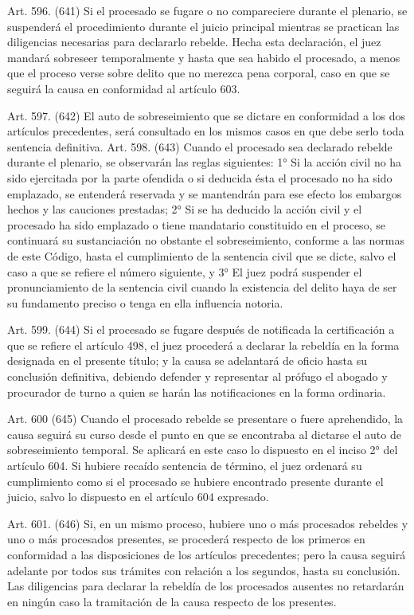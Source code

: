     Art. 596. (641) Si el procesado se fugare o no compareciere durante el plenario, se suspenderá el procedimiento durante el juicio principal mientras se practican las diligencias necesarias para declararlo rebelde.
    Hecha esta declaración, el juez mandará sobreseer temporalmente y hasta que sea habido el procesado, a menos que el proceso verse sobre delito que no merezca pena corporal, caso en que se seguirá la causa en conformidad al artículo 603.

    Art. 597. (642) El auto de sobreseimiento que se dictare en conformidad a los dos artículos precedentes, será consultado en los mismos casos en que debe serlo toda sentencia definitiva.
    Art. 598. (643) Cuando el procesado sea declarado rebelde durante el plenario, se observarán las reglas siguientes:
    1° Si la acción civil no ha sido ejercitada por la parte ofendida o si deducida ésta el procesado no ha sido emplazado, se entenderá reservada y se mantendrán para ese efecto los embargos hechos y las cauciones prestadas;
    2° Si se ha deducido la acción civil y el procesado ha sido emplazado o tiene mandatario constituido en el proceso, se continuará su sustanciación no obstante el sobreseimiento, conforme a las normas de este Código, hasta el cumplimiento de la sentencia civil que se dicte, salvo el caso a que se refiere el número siguiente, y
    3° El juez podrá suspender el pronunciamiento de la sentencia civil cuando la existencia del delito haya de ser su fundamento preciso o tenga en ella influencia notoria.


    Art. 599. (644) Si el procesado se fugare después de notificada la certificación a que se refiere el artículo 498, el juez procederá a declarar la rebeldía en la forma designada en el presente título; y la causa se adelantará de oficio hasta su conclusión definitiva,  debiendo defender y representar al prófugo el abogado y procurador de turno a quien se harán las notificaciones en la forma ordinaria.

   
    Art. 600 (645) Cuando el procesado rebelde se presentare o fuere aprehendido, la causa seguirá su curso desde el punto en que se encontraba al dictarse el auto de sobreseimiento temporal. Se aplicará en este caso lo dispuesto en el inciso 2° del artículo 604.
    Si hubiere recaído sentencia de término, el juez ordenará su cumplimiento como si el procesado se hubiere encontrado presente durante el juicio, salvo lo dispuesto en el artículo 604 expresado.



    Art. 601. (646) Si, en un mismo proceso, hubiere uno o más procesados rebeldes y uno o más procesados presentes, se procederá respecto de los primeros en conformidad a las disposiciones de los artículos precedentes; pero la causa seguirá adelante por todos sus trámites con relación a los segundos, hasta su conclusión.
    Las diligencias para declarar la rebeldía de los procesados ausentes no retardarán en ningún caso la tramitación de la causa respecto de los presentes.


